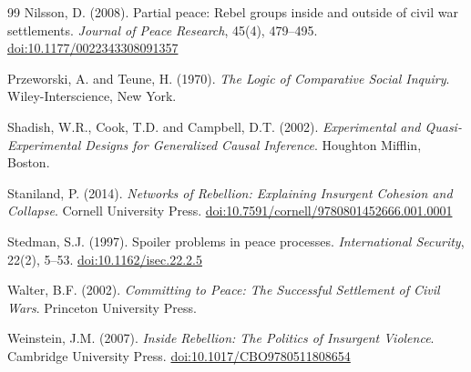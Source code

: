 \documentclass[12pt,a4paper]{article}
\begin{document}
{\begin{thebibliography}{99}
Nilsson, D. (2008). Partial peace: Rebel groups inside and outside of civil war settlements. \textit{Journal of Peace Research}, 45(4), 479--495. \href{https://doi.org/10.1177/0022343308091357}{doi:10.1177/0022343308091357}

Przeworski, A. and Teune, H. (1970). \textit{The Logic of Comparative Social Inquiry}. Wiley-Interscience, New York.

Shadish, W.R., Cook, T.D. and Campbell, D.T. (2002). \textit{Experimental and Quasi-Experimental Designs for Generalized Causal Inference}. Houghton Mifflin, Boston.

Staniland, P. (2014). \textit{Networks of Rebellion: Explaining Insurgent Cohesion and Collapse}. Cornell University Press. \href{https://doi.org/10.7591/cornell/9780801452666.001.0001}{doi:10.7591/cornell/9780801452666.001.0001}

Stedman, S.J. (1997). Spoiler problems in peace processes. \textit{International Security}, 22(2), 5--53. \href{https://doi.org/10.1162/isec.22.2.5}{doi:10.1162/isec.22.2.5}

Walter, B.F. (2002). \textit{Committing to Peace: The Successful Settlement of Civil Wars}. Princeton University Press.

Weinstein, J.M. (2007). \textit{Inside Rebellion: The Politics of Insurgent Violence}. Cambridge University Press. \href{https://doi.org/10.1017/CBO9780511808654}{doi:10.1017/CBO9780511808654}

\end{thebibliography}
}
\end{document}
